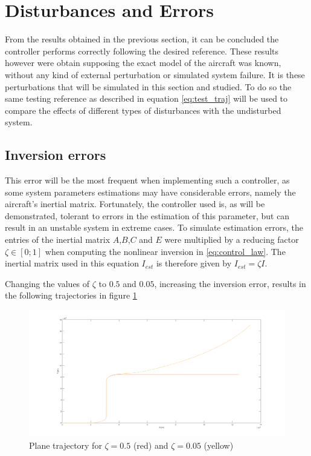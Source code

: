 \section{Disturbances and Errors}
\label{section:results/disturbances_errors}

From the results obtained in the previous section, it can be concluded the controller performs correctly following the desired reference. These results however were obtain supposing the exact model of the aircraft was known, without any kind of external perturbation or simulated system failure. It is these perturbations that will be simulated in this section and studied. To do so the same testing reference as described in equation \ref{eq:test_traj} will be used to compare the effects of different types of disturbances with the undisturbed system. 

\subsection{Inversion errors}

This error will be the most frequent when implementing such a controller, as some system parameters estimations may have considerable errors, namely the aircraft's inertial matrix. Fortunately, the controller used is, as will be demonstrated, tolerant to errors in the estimation of this parameter, but can result in an unstable system in extreme cases. To simulate estimation errors, the entries of the inertial matrix $A$,$B$,$C$ and $E$ were multiplied by a reducing factor $\zeta \in [0;1]$ when computing the nonlinear inversion in \ref{eq:control_law}. The inertial matrix used in this equation $I_{est}$ is therefore given by $I_{est} = \zeta I$.

Changing the values of $\zeta$ to $0.5$ and $0.05$, increasing the inversion error, results in the following trajectories in figure \ref{fig:inversion_error}

\begin{figure}[H]
\centering
\includegraphics[width=\textwidth]{Figures/Results/inversion_error.png}
\caption[Plane trajectory with inertia estimation errors]{Plane trajectory for $\zeta = 0.5$ (red) and $\zeta= 0.05$ (yellow)}
\label{fig:inversion_error}
\end{figure}

